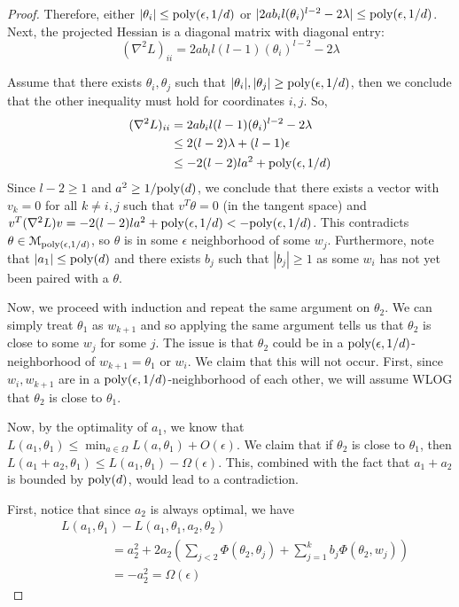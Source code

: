 \begin{proof}
Therefore, either $|\theta_i| \leq \mathrm{poly}(\epsilon,1/d)$ or $|2ab_il(\theta_i)^{l-2} - 2 \lambda |\leq \mathrm{poly}(\epsilon,1/d)$. Next, the projected Hessian is a diagonal matrix with diagonal entry: 
%
\[(\nabla^2 L)_{ii} = 2a b_i l(l-1)(\theta_i)^{l-2} - 2 \lambda\]

Assume that there exists $\theta_i, \theta_j$ such that $|\theta_i|,|\theta_j| \geq \mathrm{poly}(\epsilon,1/d)$, then we conclude that the other inequality must hold for coordinates $i, j$. So,
%
\begin{align*}
(\nabla^2 L)_{ii} & = 2a b_i l(l-1)(\theta_i)^{l-2} - 2 \lambda \\
& \leq
  2(l-2)\lambda + (l-1)\epsilon \\
&  \leq -2(l-2)la^2 + \mathrm{poly}(\epsilon,1/d)
\end{align*}
%
Since $l-2 \geq 1$ and $a^2 \geq 1/\mathrm{poly}(d)$, we conclude that there
exists a vector with $v_k = 0$ for all $k\neq i, j$ such that
$v^T\theta = 0$ (in the tangent space) and
$v^T(\nabla^2 L) v = -2(l-2)l a^2 + \mathrm{poly}(\epsilon,1/d) <
-\mathrm{poly}(\epsilon,1/d)$.
This contradicts $\theta \in \mathcal{M}_{\mathrm{poly}(\epsilon,1/d)}$, so
$\theta$ is in some $\epsilon$ neighborhood of some
$w_j$. Furthermore, note that $|a_1| \leq \mathrm{poly}(d)$ and there exists
$b_j$ such that $|b_j| \geq 1$ as some $w_i$ has not yet been paired
with a $\theta$.

Now, we proceed with induction and repeat the same argument on $\theta_2$. We can simply treat $\theta_1$ as $w_{k+1}$ and so applying the same argument tells us that $\theta_2$ is close to some $w_j$ for some $j$. The issue is that $\theta_2$ could be in a $\mathrm{poly}(\epsilon,1/d)$-neighborhood of $w_{k+1} = \theta_1$ or $w_i$. We claim that this will not occur. First, since $w_i, w_{k+1}$ are in a $\mathrm{poly}(\epsilon,1/d)$-neighborhood of each other, we will assume WLOG that $\theta_2$ is close to $\theta_1$.

Now, by the optimality of $a_1$, we know that $L(a_1,\theta_1) \leq \min_{a \in \Omega} L(a,\theta_1) + O(\epsilon)$. We claim that if $\theta_2$ is close to $\theta_1$, then $L(a_1+a_2,\theta_1) \leq L(a_1,\theta_1) - \Omega(\epsilon)$. This, combined with the fact that $a_1 + a_2$ is bounded by $\mathrm{poly}(d)$, would lead to a contradiction.

First, notice that since $a_2$ is always optimal, we have
\begin{align*}
& L(a_1,\theta_1) - L(a_1,\theta_1,a_2,\theta_2) \\
& \qquad \qquad = a_2^2 + 2a_2 (\sum_{j < 2} \Phi(\theta_2,\theta_j) + \sum_{j=1}^k b_j \Phi(\theta_2,w_j)) \\
& \qquad \qquad = -a_2^2 = \Omega(\epsilon)
\end{align*}


\end{proof}
